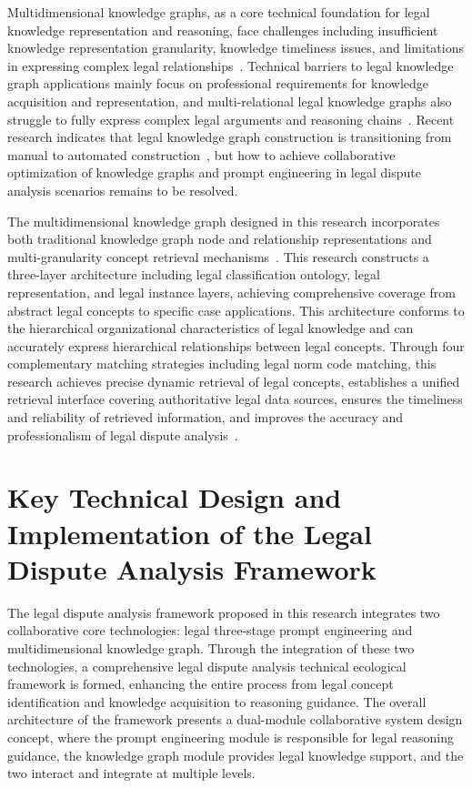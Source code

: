 \documentclass{article}
\theoremstyle{plain}
\theoremstyle{definition}
\begin{document}
Multidimensional knowledge graphs, as a core technical foundation for legal knowledge representation and reasoning, face challenges including insufficient knowledge representation granularity, knowledge timeliness issues, and limitations in expressing complex legal relationships~\cite{Liu2023,Li2024}. Technical barriers to legal knowledge graph applications mainly focus on professional requirements for knowledge acquisition and representation, and multi-relational legal knowledge graphs also struggle to fully express complex legal arguments and reasoning chains~\cite{Pan2023}. Recent research indicates that legal knowledge graph construction is transitioning from manual to automated construction~\cite{Xiao2023}, but how to achieve collaborative optimization of knowledge graphs and prompt engineering in legal dispute analysis scenarios remains to be resolved.

The multidimensional knowledge graph designed in this research incorporates both traditional knowledge graph node and relationship representations and multi-granularity concept retrieval mechanisms~\cite{Zheng2021}. This research constructs a three-layer architecture including legal classification ontology, legal representation, and legal instance layers, achieving comprehensive coverage from abstract legal concepts to specific case applications. This architecture conforms to the hierarchical organizational characteristics of legal knowledge and can accurately express hierarchical relationships between legal concepts. Through four complementary matching strategies including legal norm code matching, this research achieves precise dynamic retrieval of legal concepts, establishes a unified retrieval interface covering authoritative legal data sources, ensures the timeliness and reliability of retrieved information, and improves the accuracy and professionalism of legal dispute analysis~\cite{Yang2023}.

\FloatBarrier
\section{Key Technical Design and Implementation of the Legal Dispute Analysis Framework}
\label{sec3}

The legal dispute analysis framework proposed in this research integrates two collaborative core technologies: legal three-stage prompt engineering and multidimensional knowledge graph. Through the integration of these two technologies, a comprehensive legal dispute analysis technical ecological framework is formed, enhancing the entire process from legal concept identification and knowledge acquisition to reasoning guidance. The overall architecture of the framework presents a dual-module collaborative system design concept, where the prompt engineering module is responsible for legal reasoning guidance, the knowledge graph module provides legal knowledge support, and the two interact and integrate at multiple levels.
\end{document}
